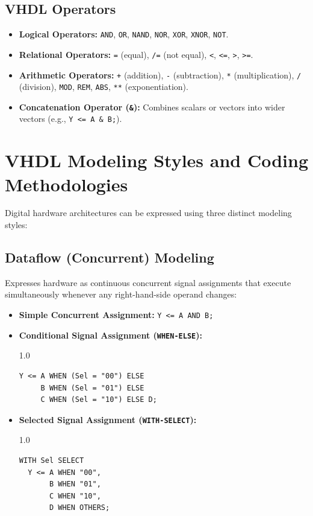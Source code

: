 \documentclass[12pt,a4paper]{article}
\begin{document}
\subsection{VHDL Operators}
\begin{itemize}[leftmargin=*, itemsep=2pt]
  \item \textbf{Logical Operators:} \texttt{AND}, \texttt{OR}, \texttt{NAND}, \texttt{NOR}, \texttt{XOR}, \texttt{XNOR}, \texttt{NOT}.
  \item \textbf{Relational Operators:} \texttt{=} (equal), \texttt{/=} (not equal), \texttt{<}, \texttt{<=}, \texttt{>}, \texttt{>=}.
  \item \textbf{Arithmetic Operators:} \texttt{+} (addition), \texttt{-} (subtraction), \texttt{*} (multiplication), \texttt{/} (division), \texttt{MOD}, \texttt{REM}, \texttt{ABS}, \texttt{**} (exponentiation).
  \item \textbf{Concatenation Operator (\texttt{\&}):} Combines scalars or vectors into wider vectors (e.g., \texttt{Y <= A \& B;}).
\end{itemize}

\section{VHDL Modeling Styles and Coding Methodologies}

Digital hardware architectures can be expressed using three distinct modeling styles:

\subsection{Dataflow (Concurrent) Modeling}
Expresses hardware as continuous concurrent signal assignments that execute simultaneously whenever any right-hand-side operand changes:
\begin{itemize}[leftmargin=*, itemsep=3pt]
  \item \textbf{Simple Concurrent Assignment:} \texttt{Y <= A AND B;}
  \item \textbf{Conditional Signal Assignment (\texttt{WHEN-ELSE}):}
\begin{spacing}{1.0}
\begin{verbatim}
Y <= A WHEN (Sel = "00") ELSE
     B WHEN (Sel = "01") ELSE
     C WHEN (Sel = "10") ELSE D;
\end{verbatim}
\end{spacing}
  \item \textbf{Selected Signal Assignment (\texttt{WITH-SELECT}):}
\begin{spacing}{1.0}
\begin{verbatim}
WITH Sel SELECT
  Y <= A WHEN "00",
       B WHEN "01",
       C WHEN "10",
       D WHEN OTHERS;
\end{verbatim}
\end{spacing}
\end{itemize}
\end{document}
